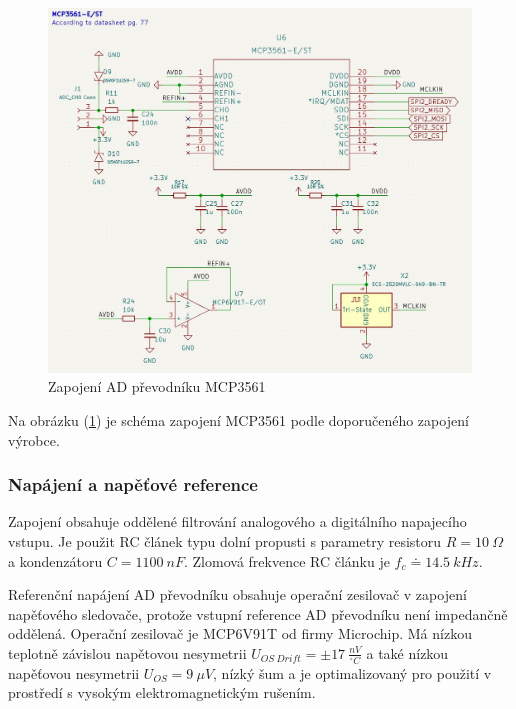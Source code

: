 \begin{figure}[H]
    \centering
    \caption{Zapojení AD převodníku MCP3561}
    \label{fig:mcp3561_connection}
    \includegraphics[width=1\linewidth]{pictures/mcp3561_connection.jpg}
\end{figure}
Na obrázku (\ref{fig:mcp3561_connection}) je schéma zapojení MCP3561 podle doporučeného zapojení výrobce.
\subsubsection{Napájení a napěťové reference}
Zapojení obsahuje oddělené filtrování analogového a digitálního napajecího vstupu. Je použit RC článek typu dolní propusti s parametry resistoru $R = 10 \ \Omega$ a kondenzátoru $C = 1100 \ nF$. Zlomová frekvence RC článku je $f_c \doteq 14.5 \ kHz$.
\par
Referenční napájení AD převodníku obsahuje operační zesilovač v zapojení napěťového sledovače, protože vstupní reference AD převodníku není impedančně oddělená. Operační zesilovač je MCP6V91T od firmy Microchip. Má nízkou teplotně závislou napětovou nesymetrii $U_{OS \ Drift} = \pm 17  \ \frac{nV}{^\circ C}$
a také nízkou napěťovou nesymetrii $U_{OS} = 9 \ \mu V$, nízký šum a je optimalizovaný pro použití v prostředí s vysokým elektromagnetickým rušením.

